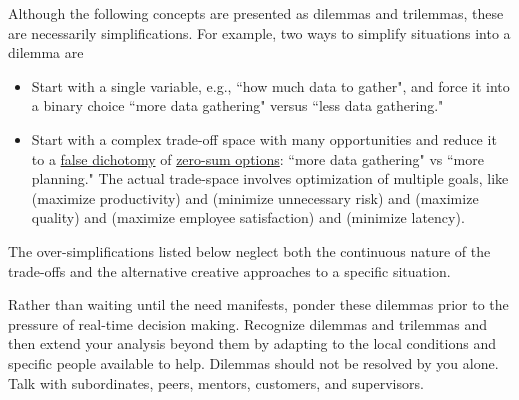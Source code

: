 Although the following concepts are presented as dilemmas and trilemmas, these are necessarily simplifications. For example, two ways to simplify situations into a dilemma are
\begin{itemize}
    \item Start with a single variable, e.g., ``how much data to gather", and force it into a binary choice ``more data gathering" versus ``less data gathering."
    
    \item Start with a complex trade-off space with many opportunities and reduce it to a \href{https://en.wikipedia.org/wiki/False_dilemma}{false dichotomy} 
    of 
    \href{https://en.wikipedia.org/wiki/Zero-sum_thinking}{zero-sum options}: 
    ``more data gathering" vs ``more planning." The actual trade-space involves optimization of multiple goals, like (maximize productivity) and (minimize unnecessary risk) and (maximize quality) and (maximize employee satisfaction) and (minimize latency). 
\end{itemize}
The over-simplifications listed below neglect both the continuous nature of the trade-offs and the alternative creative approaches to a specific situation. 





Rather than waiting until the need manifests, ponder these dilemmas prior to the pressure of real-time decision making.  Recognize dilemmas and trilemmas and then extend your analysis beyond them by adapting to the local conditions and specific people available to help.
Dilemmas should not be resolved by you alone. Talk with subordinates, peers, mentors, customers, and supervisors.


